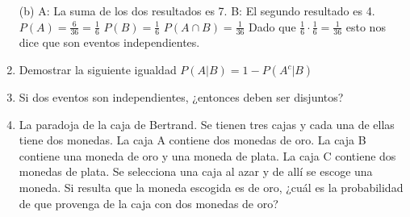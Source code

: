 \documentclass[a4paper, 12pt]{article}
\newcommand{\Pspace}{0.5cm}
\newcommand{\Aspace}{0.2cm}
\begin{document}
\begin{enumerate}
    \vspace{\Aspace}
    (b) A: La suma de los dos resultados es 7. B: El segundo resultado es 4.
    \\ { \color{azul} 
        $P(A) = \frac{6}{36} = \frac{1}{6}$
        \newline $P(B) = \frac{1}{6}$
        \newline $P(A \cap B) = \frac{1}{36}$
        \newline Dado que $\frac{1}{6} \cdot \frac{1}{6} = \frac{1}{36}$ esto nos dice que son eventos independientes.
    }
    

    \vspace{\Pspace}
    \item Demostrar la siguiente igualdad $P(A | B) = 1 - P(A^{c} | B)$
    \vspace{\Aspace} \par
    { \color{azul}  }

    
    \vspace{\Pspace}
    \item Si dos eventos son independientes, ¿entonces deben ser disjuntos?
    \vspace{\Aspace} \par
    { \color{azul}  }


    \vspace{\Pspace}
    \item La paradoja de la caja de Bertrand. Se tienen tres cajas y cada una de ellas tiene dos monedas. La caja A contiene dos monedas de oro. La caja B contiene una moneda de oro y una moneda de plata. La caja C contiene dos monedas de plata. Se selecciona una caja al azar y de allí se escoge una moneda. Si resulta que la moneda escogida es de oro, ¿cuál es la probabilidad de que provenga de la caja con dos monedas de oro?
    \vspace{\Aspace} \par
    { \color{azul}  }
\end{enumerate}
\end{document}
